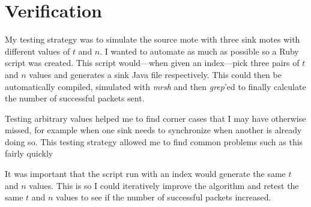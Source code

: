 \documentclass{article}
\begin{document}
\section{Verification}

My testing strategy was to simulate the source mote with three sink motes with different values of $t$ and $n$. I wanted to automate as much as possible so a Ruby script was created. This script would---when given an index---pick three pairs of $t$ and $n$ values and generates a sink Java file respectively. This could then be automatically compiled, simulated with \emph{mrsh} and then \emph{grep}'ed to finally calculate the number of successful packets sent.

Testing arbitrary values helped me to find corner cases that I may have otherwise missed, for example when one sink needs to synchronize when another is already doing so. This testing strategy allowed me to find common problems such as this fairly quickly

It was important that the script run with an index would generate the same $t$ and $n$ values. This is so I could iteratively improve the algorithm and retest the same $t$ and $n$ values to see if the number of successful packets increased.


\end{document}
